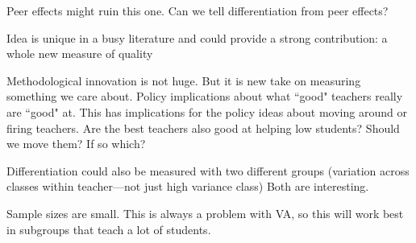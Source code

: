 \documentclass[letterpaper,12pt]{article}
\begin{document}
Peer effects might ruin this one. Can we tell differentiation from peer effects?

Idea is  unique in a busy literature and could provide a strong contribution: a whole new measure of quality

Methodological innovation is not huge. But it is new take on measuring something we care about. Policy implications about what ``good" teachers really are ``good" at. This has implications for the policy ideas about moving around or firing teachers. Are the best teachers also good at helping low students? Should we move them? If so which?

Differentiation could also be measured with two different groups (variation across classes within teacher---not just high variance class) Both are interesting.

Sample sizes are small. This is always a problem with VA, so this will work best in subgroups that teach a lot of students.
\end{document}
